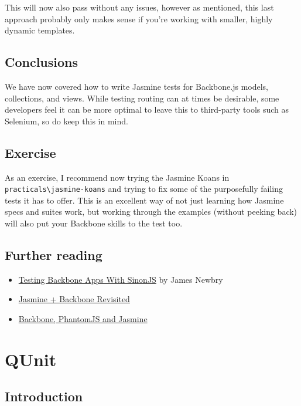 \documentclass[9pt]{book}
\begin{document}
This will now also pass without any issues, however as mentioned, this
last approach probably only makes sense if you're working with smaller,
highly dynamic templates.

\subsection{Conclusions}\label{conclusions-2}

We have now covered how to write Jasmine tests for Backbone.js models,
collections, and views. While testing routing can at times be desirable,
some developers feel it can be more optimal to leave this to third-party
tools such as Selenium, so do keep this in mind.

\subsection{Exercise}\label{exercise}

As an exercise, I recommend now trying the Jasmine Koans in
\texttt{practicals\textbackslash{}jasmine-koans} and trying to fix some
of the purposefully failing tests it has to offer. This is an excellent
way of not just learning how Jasmine specs and suites work, but working
through the examples (without peeking back) will also put your Backbone
skills to the test too.

\subsection{Further reading}\label{further-reading-1}

\begin{itemize}
\itemsep1pt\parskip0pt
\item
  \href{http://tinnedfruit.com/2011/04/26/testing-backbone-apps-with-jasmine-sinon-3.html}{Testing
  Backbone Apps With SinonJS} by James Newbry
\item
  \href{http://japhr.blogspot.com/2011/11/jasmine-backbonejs-revisited.html}{Jasmine
  + Backbone Revisited}
\item
  \href{http://japhr.blogspot.com/2011/12/phantomjs-and-backbonejs-and-requirejs.html}{Backbone,
  PhantomJS and Jasmine}
\end{itemize}

\section{QUnit}\label{qunit}

\subsection{Introduction}\label{introduction-3}
\end{document}
